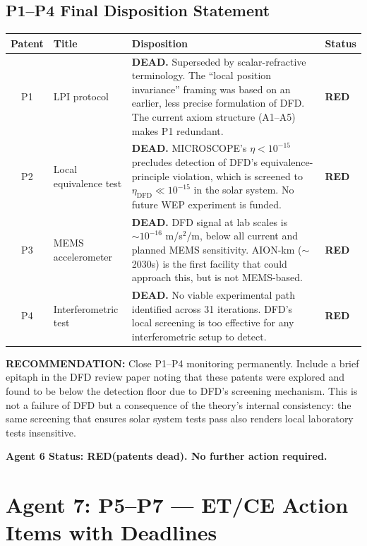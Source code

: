 \documentclass[11pt,a4paper]{article}
\newcommand{\RED}{\textcolor{dfdred}{\textbf{RED}}}
\begin{document}
\subsection{P1--P4 Final Disposition Statement}

\begin{center}
\begin{longtable}{clp{7cm}l}
\toprule
\textbf{Patent} & \textbf{Title} & \textbf{Disposition} & \textbf{Status} \\
\midrule
\endfirsthead
P1 & LPI protocol & \textbf{DEAD.} Superseded by scalar-refractive terminology. The ``local position invariance'' framing was based on an earlier, less precise formulation of DFD. The current axiom structure (A1--A5) makes P1 redundant. & \RED \\
P2 & Local equivalence test & \textbf{DEAD.} MICROSCOPE's $\eta < 10^{-15}$ precludes detection of DFD's equivalence-principle violation, which is screened to $\eta_\mathrm{DFD} \ll 10^{-15}$ in the solar system. No future WEP experiment is funded. & \RED \\
P3 & MEMS accelerometer & \textbf{DEAD.} DFD signal at lab scales is $\sim 10^{-16}$ m/s$^2$/m, below all current and planned MEMS sensitivity. AION-km ($\sim$2030s) is the first facility that could approach this, but is not MEMS-based. & \RED \\
P4 & Interferometric test & \textbf{DEAD.} No viable experimental path identified across 31 iterations. DFD's local screening is too effective for any interferometric setup to detect. & \RED \\
\bottomrule
\end{longtable}
\end{center}

\textbf{RECOMMENDATION:} Close P1--P4 monitoring permanently. Include a brief epitaph in the DFD review paper noting that these patents were explored and found to be below the detection floor due to DFD's screening mechanism. This is not a failure of DFD but a consequence of the theory's internal consistency: the same screening that ensures solar system tests pass also renders local laboratory tests insensitive.

\textbf{Agent 6 Status: \RED (patents dead). No further action required.}

\section{Agent 7: P5--P7 --- ET/CE Action Items with Deadlines}
\end{document}
